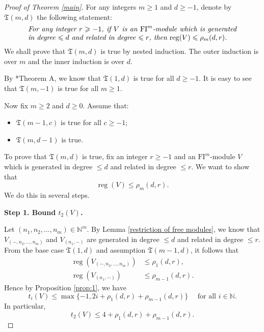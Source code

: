 \documentclass{amsart}
\numberwithin{equation}{section}
\DeclareMathOperator{\reg}{reg}
\newcommand{\N}{{\mathbb{N}}}
\newcommand{\FI}{{\mathrm{FI}}}
\begin{document}
\begin{proof}[Proof of Theorem \ref{main}]
   For any integers $m\geqslant 1$ and $d\geqslant -1$, denote by $\mathfrak{T}(m, d)$ the following statement:
   \begin{equation*}
      \parbox{.85\textwidth}{\it For any integer $r\geqslant -1$, if $V$ is an $\FI^m$-module which is generated in degree $\leqslant d$ and related in degree $\leqslant r$, then $\reg(V)\leqslant \rho_m(d,r)$.}
   \end{equation*}
   We shall prove that $\mathfrak{T}(m,d)$ is true by nested induction. The outer induction is over $m$ and the inner induction is over $d$. 

   By \cite{ce}*{Theorem A}, we know that $\mathfrak{T}(1,d)$ is true for all $d\geqslant -1$. It is easy to see that $\mathfrak{T}(m,-1)$ is true for all $m\geqslant 1$. 

   Now fix $m\geqslant 2$ and $d\geqslant 0$. Assume that:
   \begin{itemize}
      \item $\mathfrak{T}(m-1, c)$ is true for all $c\geqslant -1$;
      \item $\mathfrak{T}(m, d-1)$ is true.
   \end{itemize}
   To prove that $\mathfrak{T}(m,d)$ is true, fix an integer $r\geqslant -1$ and an $\FI^m$-module $V$ which is generated in degree $\leqslant d$ and related in degree $\leqslant r$. We want to show that 
   \[ \reg(V) \leqslant \rho_m(d,r). \] 
   We do this in several steps. 
 
   \medskip 

   {\bf Step 1. Bound $t_2(V)$.}

   Let $(n_1, n_2, \ldots, n_m)\in \N^m$. By Lemma \ref{restriction of free modules}, we know that $V_{(-, n_2, \ldots, n_m)}$ and $V_{(n_1, -)}$ are generated in degree $\leqslant d$ and related in degree $\leqslant r$. From the base case $\mathfrak{T}(1,d)$ and assumption $\mathfrak{T}(m-1,d)$, it follows that 
   \begin{align*}
      \reg\left( V_{(-,n_2,\ldots, n_m)} \right) &\leqslant \rho_1 (d,r),\\
      \reg\left( V_{(n_1,-)}\right) &\leqslant \rho_{m-1} (d,r).
   \end{align*}
   Hence by Proposition \ref{prop:1}, we have 
   \[ t_i(V) \leqslant \max\{-1, 2i + \rho_1(d,r) + \rho_{m-1}(d,r)\} \quad \mbox{ for all } i\in \N. \]
   In particular, 
   \begin{equation} \label{eq:t2bound}
      t_2(V) \leqslant 4 + \rho_1(d,r) + \rho_{m-1}(d,r).
   \end{equation}


\end{proof}
\end{document}
